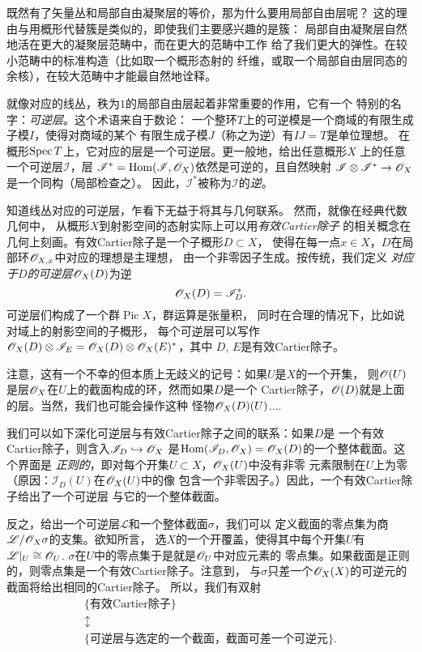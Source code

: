既然有了矢量丛和局部自由凝聚层的等价，那为什么要用局部自由层呢？
这的理由与用概形代替簇是类似的，即使我们主要感兴趣的是簇：
局部自由凝聚层自然地活在更大的凝聚层范畴中，而在更大的范畴中工作
给了我们更大的弹性。在较小范畴中的标准构造（比如取一个概形态射的
纤维，或取一个局部自由层同态的余核），在较大范畴中才能最自然地诠释。

就像对应的线丛，秩为$1$的局部自由层起着非常重要的作用，它有一个
特别的名字：\textit{可逆层}。这个术语来自于数论：
一个整环$T$上的可逆模是一个商域的有限生成子模$I$，使得对商域的某个
有限生成子模$J$（称之为逆）有$IJ=T$是单位理想。%
在概形$\operatorname{Spec} T$上，它对应的层是一个可逆层。更一般地，给出任意概形$X$
上的任意一个可逆层$\mathscr I$，层
$\mathscr I^*=\operatorname{Hom}(\mathscr I,\mathscr{O}_X)$依然是可逆的，且自然映射
$\mathscr I\otimes \mathscr I^*\to \mathscr{O}_X$是一个同构（局部检查之）。
因此，$\mathscr I^*$被称为$\mathscr I$的\textit{逆}。

知道线丛对应的可逆层，乍看下无益于将其与几何联系。
然而，就像在经典代数几何中，
从概形$X$到射影空间的态射实际上可以用\textit{有效Cartier除子}
的相关概念在几何上刻画。有效Cartier除子是一个子概形$D\subset X$，
使得在每一点$x\in X$，$D$在局部环$\mathscr{O}_{X,x}$中对应的理想是主理想，
由一个非零因子生成。按传统，我们定义
\textit{对应于$D$的可逆层$\mathscr{O}_X(D)$}为逆
\[
	\mathscr{O}_X(D)=\mathscr I_D^*.
\]
可逆层们构成了一个群$\operatorname{Pic} X$，群运算是张量积，
同时在合理的情况下，比如说对域上的射影空间的子概形，
每个可逆层可以写作
$\mathscr{O}_X(D)\otimes \mathscr I_E=\mathscr{O}_X(D)\otimes \mathscr{O}_X(E)^*$，其中
$D$, $E$是有效Cartier除子。

注意，这有一个不幸的但本质上无歧义的记号：如果$U$是$X$的一个开集，
则$\mathscr{O}(U)$是层$\mathscr{O}_X$在$U$上的截面构成的环，然而如果$D$是一个
Cartier除子，$\mathscr{O}(D)$就是上面的层。当然，我们也可能会操作这种
怪物$\mathscr{O}_X(D)(U)$....

我们可以如下深化可逆层与有效Cartier除子之间的联系：如果$D$是
一个有效Cartier除子，则含入$\mathscr I_D\hookrightarrow \mathscr{O}_X$
是$\operatorname{Hom}(\mathscr I_D,\mathscr{O}_X)=\mathscr{O}_X(D)$的一个整体截面。这个界面是
\textit{正则的}，即对每个开集$U\subset X$，$\mathscr{O}_X(U)$中没有非零
元素限制在$U$上为零（原因：$\mathscr I_D(U)$在$\mathscr{O}_X(U)$中的像
包含一个非零因子。）因此，一个有效Cartier除子给出了一个可逆层
与它的一个整体截面。

反之，给出一个可逆层$\mathscr L$和一个整体截面$\sigma$，我们可以
定义截面的零点集为商$\mathscr L/\mathscr{O}_X\sigma$的支集。欲知所言，
选$X$的一个开覆盖，使得其中每个开集$U$有$\mathscr L|_{U}
\cong \mathscr{O}_U$. $\sigma$在$U$中的零点集于是就是$\mathscr{O}_U$中对应元素的
零点集。如果截面是正则的，则零点集是一个有效Cartier除子。注意到，
与$\sigma$只差一个$\mathscr{O}_X(X)$的可逆元的截面将给出相同的Cartier除子。
所以，我们有双射
\[
	\begin{array}{c}
	\{\text{有效Cartier除子}\}\\
	\updownarrow \\
	\{\text{可逆层与选定的一个截面，截面可差一个可逆元}\}.
	\end{array}
\]

